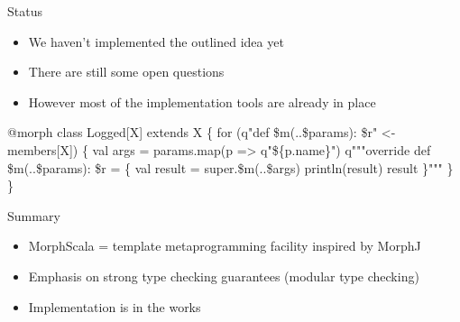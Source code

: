 \documentclass[svgnames,dvipsnames,hyperref={bookmarks=false},usepdftitle=false]{beamer}
\begin{document}

\begin{frame}{Status}
\begin{itemize}
\item We haven't implemented the outlined idea yet
\item There are still some open questions
\item However most of the implementation tools are already in place
\end{itemize}
\end{frame}

\begin{frame}[fragile]{}
\begin{semiverbatim}
\alert<2>{@morph}
class Logged[X] extends X \{
  for (q"def \$m(..\$params): \$r" <- members[X]) \{
    \alert<1>{val args = params.map(p => q"\$\{p.name\}")}
    q"""override def \$m(..\$params): \$r = \{
          val result = super.\$m(..\$args)
          println(result)
          result
        \}"""
  \}
\}

\end{semiverbatim}

\begin{itemize}
\end{itemize}
\end{frame}

\begin{frame}{Summary}
\begin{itemize}
\item MorphScala = template metaprogramming facility inspired by MorphJ
\item Emphasis on strong type checking guarantees (modular type checking)
\item Implementation is in the works
\end{itemize}
\end{frame}
\end{document}
